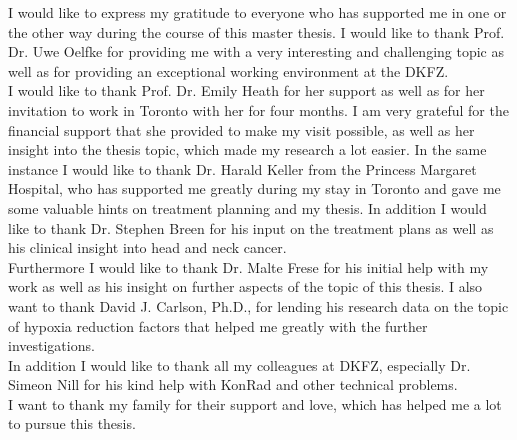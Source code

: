 %
I would like to express my gratitude to everyone who has supported me in one or the other way during the course of this master thesis. I would like to thank Prof. Dr. Uwe Oelfke for providing me with a very interesting and challenging topic as well as for providing an exceptional working environment at the DKFZ.\\I would like to thank Prof. Dr. Emily Heath for her support as well as for her invitation to work in Toronto with her for four months. I am very grateful for the financial support that she provided to make my visit possible, as well as her insight into the thesis topic, which made my research a lot easier. In the same instance I would like to thank Dr. Harald Keller from the Princess Margaret Hospital, who has supported me greatly during my stay in Toronto and gave me some valuable hints on treatment planning and my thesis. In addition I would like to thank Dr. Stephen Breen for his input on the treatment plans as well as his clinical insight into head and neck cancer.\\Furthermore I would like to thank Dr. Malte Frese for his initial help with my work as well as his insight on further aspects of the topic of this thesis. I also want to thank David J. Carlson, Ph.D., for lending his research data on the topic of hypoxia reduction factors that helped me greatly with the further investigations.\\In addition I would like to thank all my colleagues at DKFZ, especially Dr. Simeon Nill for his kind help with KonRad and other technical problems.\\I want to thank my family for their support and love, which has helped me a lot to pursue this thesis.
